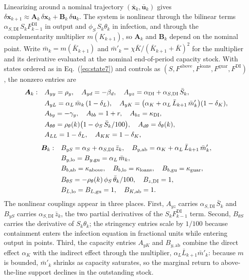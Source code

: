 \documentclass[12pt, a4paper]{article}
\begin{document}
Linearizing around a nominal trajectory $(\bar{\bm{x}}_k, \bar{\bm{u}}_k)$ gives
$\delta\bm{x}_{k+1} \approx \bm{A}_k\,\delta\bm{x}_k + \bm{B}_k\,\delta\bm{u}_k$.
The system is nonlinear through the bilinear terms
$\alpha_{S,\text{DI}}\, S_k F^{\text{DI}}_{k-1}$ in output and
$\phi_S\, S_k \theta_k$ in infection, and through the complementarity multiplier
$m(K_{k+1})$, so $\bm{A}_k$ and $\bm{B}_k$ depend on the nominal point. Write
$\bar m_k = m(\bar K_{k+1})$ and
$\bar m'_k = \chi \bar K / (\bar K_{k+1} + \bar K)^2$ for the multiplier and its
derivative evaluated at the nominal end-of-period capacity stock. With states
ordered as in Eq.~(\ref{eq:state7}) and controls as
$(S, F^{\text{above}}, F^{\text{loans}}, F^{\text{guar}}, F^{\text{DI}})$, the
nonzero entries are
%
\begin{align}
    \bm{A}_k:\quad
    & A_{yy} = \rho_y, \quad
      A_{yd} = -\beta_d, \quad
      A_{y z} = \alpha_{\text{DI}} + \alpha_{S,\text{DI}}\,\bar{S}_k, \notag \\
    & A_{y L} = \alpha_L\,\bar m_k\,(1-\delta_L), \quad
      A_{y K} = \bigl(\alpha_K + \alpha_L\,\bar L_{k+1}\,\bar m'_k\bigr)(1-\delta_K), \notag \\
    & A_{by} = -\gamma_y, \quad A_{bb} = 1+r, \quad A_{bz} = \kappa_{\text{DI}}, \notag \\
    & A_{\theta\theta} = \rho_\theta(k)\bigl(1 - \phi_S\,\bar{S}_k/100\bigr), \quad
      A_{d\theta} = \delta_\theta(k), \notag \\
    & A_{LL} = 1-\delta_L, \quad A_{KK} = 1-\delta_K,
    \label{eq:Ak}
\end{align}
%
\begin{align}
    \bm{B}_k:\quad
    & B_{yS} = \alpha_S + \alpha_{S,\text{DI}}\,\bar{z}_k, \quad
      B_{y,\text{ab}} = \alpha_K + \alpha_L\,\bar L_{k+1}\,\bar m'_k, \notag \\
    & B_{y,\text{lo}} = B_{y,\text{gu}} = \alpha_L\,\bar m_k, \notag \\
    & B_{b,\text{ab}} = \kappa_{\text{above}}, \quad
      B_{b,\text{lo}} = \kappa_{\text{loans}}, \quad
      B_{b,\text{gu}} = \kappa_{\text{guar}}, \notag \\
    & B_{\theta S} = -\rho_\theta(k)\,\phi_S\,\bar{\theta}_k/100, \quad
      B_{z,\text{DI}} = 1, \notag \\
    & B_{L,\text{lo}} = B_{L,\text{gu}} = 1, \quad
      B_{K,\text{ab}} = 1 .
    \label{eq:Bk}
\end{align}
%
The nonlinear couplings appear in three places. First, $A_{yz}$ carries
$\alpha_{S,\text{DI}}\,\bar{S}_k$ and $B_{yS}$ carries
$\alpha_{S,\text{DI}}\,\bar{z}_k$, the two partial derivatives of the
$S_k F^{\text{DI}}_{k-1}$ term. Second, $B_{\theta S}$ carries the derivative of
$S_k\theta_k$; the stringency entries scale by $1/100$ because containment enters
the infection equation in fractional units while entering output in points.
Third, the capacity entries $A_{yK}$ and $B_{y,\text{ab}}$ combine the direct
effect $\alpha_K$ with the indirect effect through the multiplier,
$\alpha_L \bar L_{k+1} \bar m'_k$: because $m$ is bounded, $\bar m'_k$ shrinks as
capacity saturates, so the marginal return to above-the-line support declines in
the outstanding stock.
\end{document}
